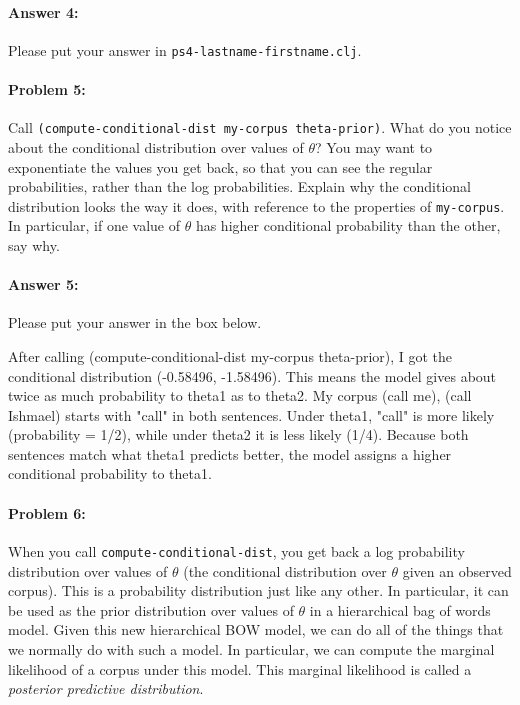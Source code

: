 \documentclass[10pt]{article}
\newenvironment{AnswerBox}{\begin{mdframed}[style=simple]}{\end{mdframed}}
\newcommand{\PSnum}{4}
\begin{document}
\paragraph{Answer 4:} Please put your answer in
\texttt{ps\PSnum-lastname-firstname.clj}.

\hrulefill %

\paragraph{Problem 5:}
Call \texttt{(compute-conditional-dist my-corpus theta-prior)}. What
do you notice about the conditional distribution over values of
$\theta$?  You may want to exponentiate the values you get back, so
that you can see the regular probabilities, rather than the log
probabilities. Explain why the conditional distribution looks the way
it does, with reference to the properties of \texttt{my-corpus}.  In
particular, if one value of $\theta$ has higher conditional probability
than the other, say why.

\paragraph{Answer 5:} Please put your answer in the box below.

\begin{AnswerBox}%

    After calling (compute-conditional-dist my-corpus theta-prior), I got the conditional distribution (-0.58496, -1.58496). This means the model gives about twice as much probability to theta1 as to theta2. My corpus {(call me), (call Ishmael)} starts with "call" in both sentences. Under theta1, "call" is more likely (probability = 1/2), while under theta2 it is less likely (1/4). Because both sentences match what theta1 predicts better, the model assigns a higher conditional probability to theta1.
    
\end{AnswerBox}%

\hrulefill %

\paragraph{Problem 6:}
When you call \texttt{compute-conditional-dist}, you get back a log
probability distribution over values of $\theta$ (the conditional
distribution over $\theta$ given an observed corpus). This is a
probability distribution just like any other. In particular, it can be
used as the prior distribution over values of $\theta$ in a
hierarchical bag of words model. Given this new hierarchical BOW
model, we can do all of the things that we normally do with such a
model. In particular, we can compute the marginal likelihood of a
corpus under this model. This marginal likelihood is called a
\emph{posterior predictive distribution}.
\end{document}
